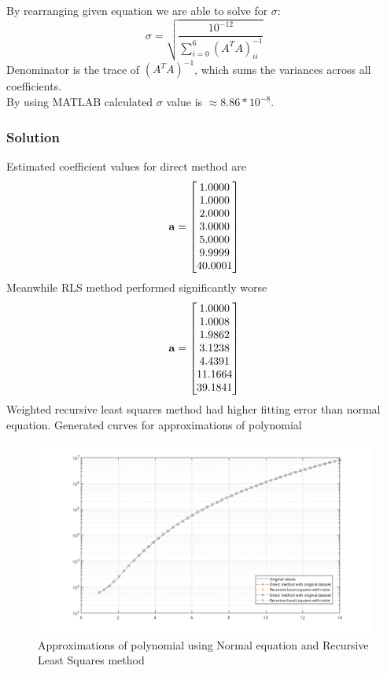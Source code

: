 By rearranging given equation we are able to solve for \(\sigma\):
\[
    \sigma = \sqrt{\frac{10^{-12}}{\sum_{i=0}^6 (A^T A)^{-1}_{ii}}}
\]
Denominator is the trace of \((A^T A)^{-1}\), which sums the variances across all coefficients.\\
By using MATLAB calculated $\sigma$ value is $\approx 8.86*10^{-8}$.

\subsubsection*{Solution}
Estimated coefficient values for direct method are
\begin{equation*}
    \mathbf{a} = \begin{bmatrix}
       1.0000 \\
       1.0000 \\
       2.0000 \\
       3.0000 \\
       5.0000 \\
       9.9999 \\
      40.0001
    \end{bmatrix}
  \end{equation*}
Meanwhile RLS method performed significantly worse
\begin{equation*}
    \mathbf{a} = \begin{bmatrix}
       1.0000 \\
       1.0008 \\
       1.9862 \\
       3.1238 \\
       4.4391 \\
       11.1664 \\
       39.1841
    \end{bmatrix}
\end{equation*}
Weighted recursive least squares method had higher fitting error than normal equation.
Generated curves for approximations of polynomial 
\begin{figure}[H]
    \centering
    \includegraphics[width=1\textwidth]{images/Problem_11/ApproxCurves.png}
    \caption{Approximations of polynomial using Normal equation and Recursive Least Squares method}
\end{figure}
